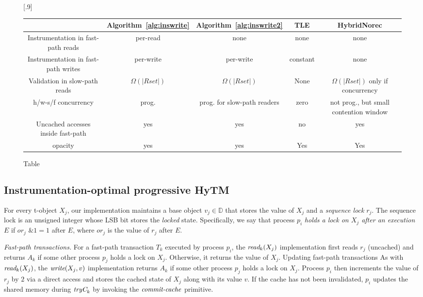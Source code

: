 
\begin{figure*}[!h]
      
     \scalebox{.9}[.9]{
     \begin{tabularx}{\textwidth}{c|c|c|c|c}
	~~~~~ & Algorithm~\ref{alg:inswrite} & Algorithm~\ref{alg:inswrite2} & TLE & HybridNorec\\ \hline
	Instrumentation in fast-path reads & per-read & none & none & none \\ \hline
	Instrumentation in fast-path writes & per-write & per-write & constant & none \\ \hline
	Validation in slow-path reads & $\Omega(|Rset|)$ & $\Omega(|Rset|)$ & None & $\Omega(|Rset|)$ only if concurrency \\ \hline
	h/w-s/f concurrency & prog. & prog. for slow-path readers & zero & not prog., but small contention window \\ \hline
	Uncached accesses inside fast-path & yes & yes & no & yes \\ \hline
	opacity & yes & yes & Yes & Yes 
   \end{tabularx}
\caption{Table}\label{fig:main}    
}
\end{figure*}
\subsection{Instrumentation-optimal progressive HyTM }
\label{sec:hytm1}
%
For every t-object $X_j$, our implementation maintains a base object $v_j\in \mathbb{D}$ that stores the value of $X_j$
and a \emph{sequence lock} $r_{j}$. The sequence lock is an unsigned integer whose LSB bit stores the \emph{locked} state.
Specifically, we say that process $p_i$ \emph{holds a lock on $X_j$ after an execution $E$} if
$\textit{or}_j$ $\mathrel{\&} 1=1$ after $E$, where $\textit{or}_j$ is the value of $r_j$ after $E$.

\vspace{1mm}\noindent\textit{Fast-path transactions.}
For a fast-path transaction $T_k$ executed by process $p_i$, the $\textit{read}_k(X_j)$ implementation first reads $r_j$ (uncached)
and returns $A_k$ if some other process $p_j$ holds a lock on $X_j$.
Otherwise, it returns the value of $X_j$.
Updating fast-path transactions 
As with $\textit{read}_k(X_j)$, the $\textit{write} (X_j,v)$ implementation returns $A_k$ if some other process $p_j$ holds a lock on $X_j$.
Process $p_i$ then increments the value of $r_j$ by $2$ via a direct access and stores the cached state of $X_j$ along with its value $v$.
If the cache has not been invalidated, $p_i$ updates the shared memory
during $\textit{tryC}_k$ by invoking the $\ms{commit-cache}$ primitive.

